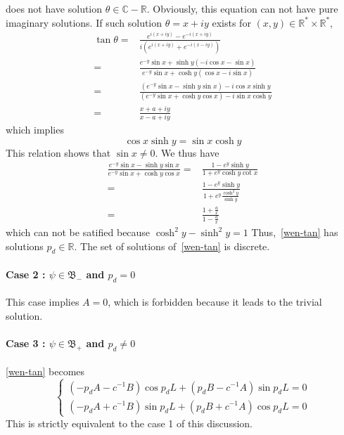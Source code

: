 does not have solution $\theta \in \mathbb{C} - \mathbb{R}$.
Obviously, this equation can not have pure imaginary solutions.
If such solution $\theta = x + i y$ exists for $(x, y) \in\mathbb{R}^*\times\mathbb{R}^*$,
\begin{equation*}
\begin{split}
\tan \theta = & \frac{e^{i(x+iy)} - e^{-i(x+iy)}}{i(e^{i(x+iy)}+ e^{-i(x-iy)})} \\
= & \frac{e^{-y}\sin x + \sinh y (-i\cos x - \sin x)}{e^{-y}\sin x + \cosh y (\cos x - i\sin x)} \\
= & \frac{(e^{-y}\sin x - \sinh y \sin x )- i\cos x \sinh y}{(e^{-y} \sin x +\cosh y \cos x) - i \sin x \cosh y} \\
=& \frac{x+a+ iy}{x -a +iy}
\end{split}
\end{equation*}
which implies
\begin{equation*}
\cos x \sinh y = \sin x \cosh y
\end{equation*}
This relation shows that $\sin x \neq 0$.
We thus have
\begin{equation*}\begin{split}
\frac{e^{-y}\sin x - \sinh y \sin x}{e^{-y}\sin x + \cosh y \cos x} = &
\frac{1 - e^y \sinh y}{1+ e^y \cosh y \cot x} \\
= &\frac{1 - e^y \sinh y }{1+ e^y \frac{\cosh^2 y }{\sinh y}} \\
=& \frac{1+\frac{a}{x}}{1 - \frac{a}{x}}
\end{split}
\end{equation*}
which can not be satified because $\cosh^2 y - \sinh^2 y =1$
Thus,~\cref{wen-tan} has solutions $p_d \in \mathbb{R}$. The set of solutions of~\cref{wen-tan} is discrete.
\paragraph{Case 2 : $\psi \in \mathfrak{B}_-$ and $p_d = 0$}
This case implies $A = 0$, which is forbidden because it leads to the trivial solution.
%
\paragraph{Case 3 : $\psi \in \mathfrak{B}_+$ and $p_d \neq 0$}
\cref{wen-tan} becomes
\begin{equation*}
\begin{cases}
(-p_d A - c^{-1} B)\cos p_d L + (p_d B - c^{-1}A)\sin p_d L = 0  \\
(-p_d A + c^{-1}B)\sin p_d L + (p_d B + c^{-1} A)\cos p_d L = 0 
\end{cases}
\end{equation*}
This is strictly equivalent to the case 1 of this discussion.
%

